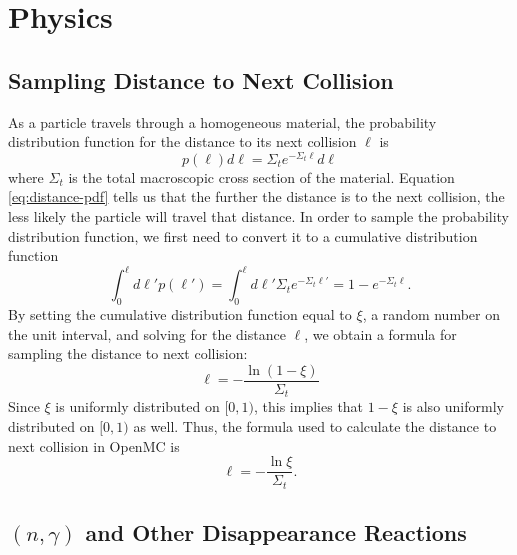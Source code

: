 \section{Physics}

\subsection{Sampling Distance to Next Collision}

As a particle travels through a homogeneous material, the probability
distribution function for the distance to its next collision $\ell$ is
\begin{equation}
  \label{eq:distance-pdf}
  p(\ell) d\ell = \Sigma_t e^{-\Sigma_t \ell} d\ell
\end{equation}
where $\Sigma_t$ is the total macroscopic cross section of the
material. Equation \eqref{eq:distance-pdf} tells us that the further the
distance is to the next collision, the less likely the particle will travel that
distance. In order to sample the probability distribution function, we first
need to convert it to a cumulative distribution function
\begin{equation}
  \label{eq:distance-cdf}
  \int_0^{\ell} d\ell' p(\ell') = \int_0^{\ell} d\ell' \Sigma_t e^{-\Sigma_t
    \ell'} = 1 - e^{-\Sigma_t \ell}.
\end{equation}
By setting the cumulative distribution function equal to $\xi$, a random number
on the unit interval, and solving for the distance $\ell$, we obtain a formula
for sampling the distance to next collision:
\begin{equation}
  \label{eq:sample-distance-1}
  \ell = -\frac{\ln (1 - \xi)}{\Sigma_t}
\end{equation}
Since $\xi$ is uniformly distributed on $[0,1)$, this implies that $1 - \xi$ is
  also uniformly distributed on $[0,1)$ as well. Thus, the formula used to
    calculate the distance to next collision in OpenMC is
\begin{equation}
  \label{eq:sample-distance-2}
  \ell = -\frac{\ln \xi}{\Sigma_t}.
\end{equation}

\subsection{$(n,\gamma)$ and Other Disappearance Reactions}

